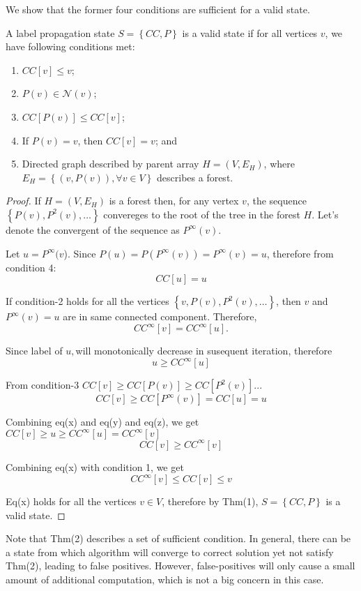 We show that the former four conditions are sufficient for a valid
state. 
\begin{thm}
A label propagation state $S=\left\{ CC,P\right\} $ is a valid state
if for all vertices $v$, we have following conditions met:
\end{thm}
\begin{enumerate}
\item $CC[v]\leq v$;
\item $P(v)\in\mathcal{N}(v)$;
\item $CC[P(v)]\leq CC[v]$; 
\item If $P(v)=v$, then $CC[v]=v$; and 
\item Directed graph described by parent array $H=(V,E_{H})$, where $E_{H}=\left\{ (v,P(v)),\forall v\in V\right\} $
describes a forest.
\end{enumerate}
\begin{proof}
If $H=\left(V,E_{H}\right)$ is a forest then, for any vertex $v$,
the sequence $\left\{ P(v),P^{2}(v),\ldots\right\} $ convereges to
the root of the tree in the forest $H$. Let's denote the convergent
of the sequence as $P^{\infty}(v)$. 

Let $u=P^{\infty}(v$). Since $P(u)=P(P^{\infty}(v))=P^{\infty}(v)=u$,
therefore from condition 4:
\begin{equation}
CC[u]=u
\end{equation}

If condition-2 holds for all the vertices $\left\{ v,P(v),P^{2}(v),\ldots\right\} $,
then $v$ and $P^{\infty}(v)=u$ are in same connected component.
Therefore,
\begin{equation}
CC^{\infty}[v]=CC^{\infty}[u].
\end{equation}

Since label of $u,$will monotonically decrease in susequent iteration,
therefore 
\begin{equation}
u\ge CC^{\infty}[u]
\end{equation}

From condition-3 $CC[v]\geq CC[P(v)]\geq CC[P^{2}(v)]...$
\begin{equation}
CC[v]\geq CC[P^{\infty}(v)]=CC[u]=u
\end{equation}

Combining eq(x) and eq(y) and eq(z), we get $CC[v]\ge u\geq CC^{\infty}[u]=CC^{\infty}[v]$
\begin{equation}
CC[v]\geq CC^{\infty}[v]
\end{equation}

Combining eq(x) with condition 1, we get 
\[
CC^{\infty}[v]\le CC[v]\le v
\]

Eq(x) holds for all the vertices $v\in V$, therefore by Thm(1), $S=\left\{ CC,P\right\} $
is a valid state.
\end{proof}
%
Note that Thm(2) describes a set of sufficient condition. In general,
there can be a state from which algorithm will converge to correct
solution yet not satisfy Thm(2), leading to false positives. However,
false-positives will only cause a small amount of additional computation,
which is not a big concern in this case. 

